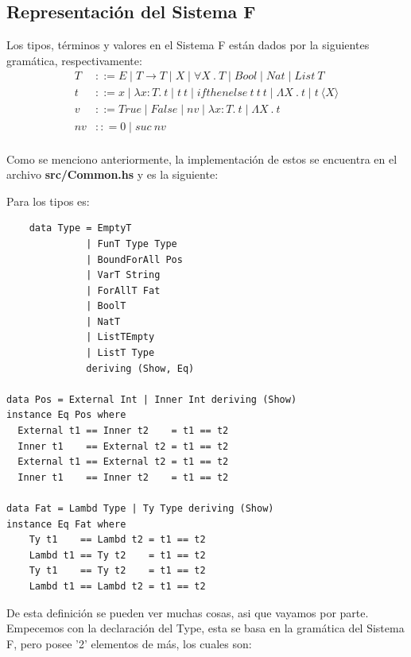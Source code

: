 \documentclass[12pt, titlepage, a4paper]{article}
\begin{document}
\subsection{Representación del Sistema F}
Los tipos, términos y valores en el Sistema F están dados por la siguientes gramática, respectivamente:
\begin{align*}
    T &::= E \mid T \rightarrow T \mid X \mid \forall X \ . \ T \mid Bool \mid Nat \mid List \ T\\
    t &::= x \mid \lambda x:T. \ t \mid t \ t \mid ifthenelse \ t \ t \ t \mid \Lambda X \ . \ t \mid t \ \langle X \rangle \\
    v &::= True \mid False \mid nv \mid \lambda x:T. \ t \mid \Lambda X \ . \ t \\
    nv &:: = 0 \mid suc \ nv \\
\end{align*}

Como se menciono anteriormente, la implementación de estos se encuentra en el archivo \textbf{src/Common.hs} y es la siguiente:

\noindent Para los tipos es:
\begin{verbatim}
    data Type = EmptyT 
              | FunT Type Type
              | BoundForAll Pos
              | VarT String
              | ForAllT Fat
              | BoolT
              | NatT
              | ListTEmpty
              | ListT Type
              deriving (Show, Eq)

data Pos = External Int | Inner Int deriving (Show)
instance Eq Pos where
  External t1 == Inner t2    = t1 == t2
  Inner t1    == External t2 = t1 == t2
  External t1 == External t2 = t1 == t2
  Inner t1    == Inner t2    = t1 == t2

data Fat = Lambd Type | Ty Type deriving (Show)
instance Eq Fat where
    Ty t1    == Lambd t2 = t1 == t2
    Lambd t1 == Ty t2    = t1 == t2
    Ty t1    == Ty t2    = t1 == t2
    Lambd t1 == Lambd t2 = t1 == t2
\end{verbatim}

De esta definición se pueden ver muchas cosas, asi que vayamos por parte. Empecemos con la declaración del Type, esta se basa en la gramática del Sistema F, pero 
posee '2' elementos de más, los cuales son: 
\end{document}
